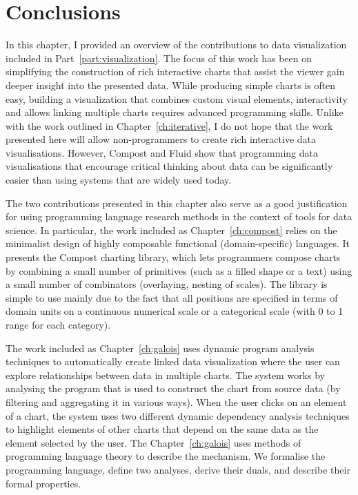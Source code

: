 \documentclass[fleqn,11pt]{report}
\theoremstyle{definition}
\begin{document}
\section{Conclusions}
In this chapter, I provided an overview of the contributions to data visualization included in
Part~\ref{part:visualization}. The focus of this work has been on simplifying the construction
of rich interactive charts that assist the viewer gain deeper insight into the presented data.
While producing simple charts is often easy, building a visualization that combines custom
visual elements, interactivity and allows linking multiple charts requires advanced programming
skills. Unlike with the work outlined in Chapter~\ref{ch:iterative}, I do not hope that the work
presented here will allow non-programmers to create rich interactive data visualisations.
However, Compost and Fluid show that programming data visualisations that encourage critical
thinking about data can be significantly easier than using systems that are widely used today.

The two contributions presented in this chapter also serve as a good justification for using
programming language research methods in the context of tools for data science. In particular,
the work included as Chapter~\ref{ch:compost} relies on the minimalist design of highly composable
functional (domain-specific) languages. It presents the Compost charting library, which lets
programmers compose charts by combining a small number of primitives (such as a filled shape
or a text) using a small number of combinators (overlaying, nesting of scales). The library is
simple to use mainly due to the fact that all positions are specified in terms of domain units
on a continuous numerical scale or a categorical scale (with 0 to 1 range for each category).

The work included as Chapter~\ref{ch:galois} uses dynamic program analysis techniques to
automatically create linked data visualization where the user can explore relationships between
data in multiple charts. The system works by analysing the program that is used to construct the
chart from source data (by filtering and aggregating it in various ways). When the user clicks on
an element of a chart, the system uses two different dynamic dependency analysis techniques to
highlight elements of other charts that depend on the same data as the element selected by the user.
The Chapter~\ref{ch:galois} uses methods of programming language theory to describe the mechanism.
We formalise the programming language, define two analyses, derive their duals, and describe their
formal properties.
\end{document}
